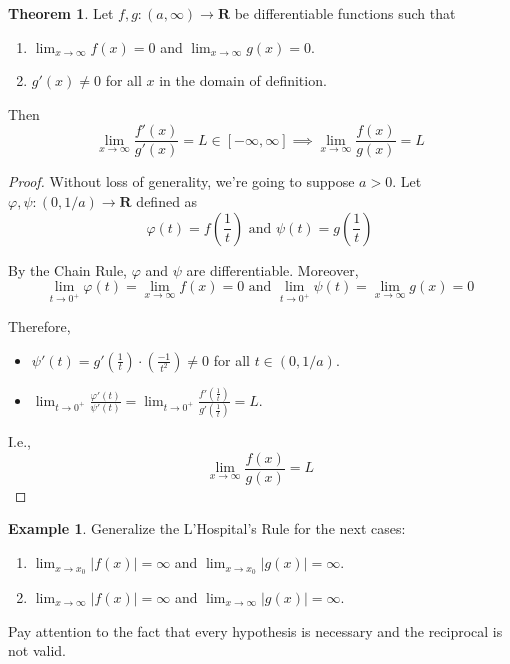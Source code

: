 \documentclass[tikz,12pt,a4paper]{article}
\theoremstyle{definition}
\newtheorem{theorem}{Theorem}[section]
\newtheorem{example}{Example}[section]
\begin{document}
\begin{theorem}
	Let $f, g : (a, \infty) \longrightarrow \textbf{R}$ be differentiable functions such that
	\begin{enumerate}
		\item $\lim_{x \to \infty} f(x) = 0$ and $\lim_{x \to \infty} g(x) = 0$.
		\item $g'(x) \neq 0$ for all $x$ in the domain of definition.
	\end{enumerate}
	
	Then 
	\[
		\lim_{x \to \infty} \frac{f'(x)}{g'(x)} = L \in [- \infty , \infty] \implies \lim_{x \to \infty} \frac{f(x)}{g(x)} = L
	\]
\end{theorem}

\begin{proof}
	Without loss of generality, we're going to suppose $a > 0$. Let $\varphi, \psi : (0, 1/a) \longrightarrow \textbf{R}$ defined as 
	\[
		\varphi(t) = f\left( \frac{1}{t} \right) \text{ and } \psi(t) = g \left( \frac{1}{t} \right)
	\]

	By the Chain Rule, $\varphi$ and $\psi$ are differentiable. Moreover,
	\[
	    \lim_{t \longrightarrow 0^+} \varphi(t) = \lim_{x \to \infty} f(x) = 0 \text{ and } \lim_{t \longrightarrow 0^+} \psi(t) = \lim_{x \to \infty} g(x) = 0
	\]

	Therefore,
	\begin{itemize}
		\item $\psi'(t) = g' \left( \frac{1}{t} \right) \cdot \left( \frac{-1}{t^2} \right) \neq 0$ for all $t \in (0, 1/a)$.
		\item $\lim_{t \to 0^+} \frac{\varphi'(t)}{\psi'(t)} = \lim_{t \to 0^+} \frac{f' \left( \frac{1}{t} \right)}{g' \left( \frac{1}{t} \right)} = L$.
	\end{itemize}

	I.e.,
	\[
		\lim_{x \to \infty} \frac{f(x)}{g(x)} = L
	\]
\end{proof}

\begin{example}
	Generalize the L'Hospital's Rule for the next cases:
	\begin{enumerate}
		\item $\lim_{x \to x_0} |f(x)| = \infty$ and $\lim_{x \to x_0} |g(x)| = \infty$.
		\item $\lim_{x \to \infty} |f(x)| = \infty$ and $\lim_{x \to \infty} |g(x)| = \infty$.
	\end{enumerate}
\end{example}

Pay attention to the fact that every hypothesis is necessary and the reciprocal is not valid.
\end{document}
